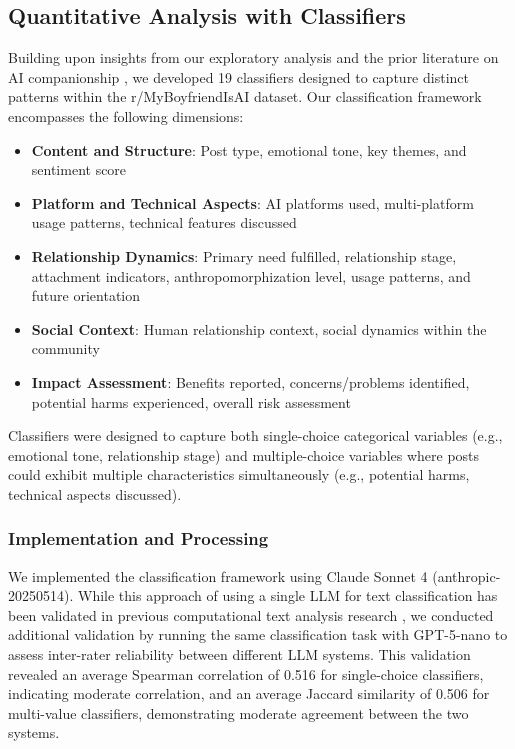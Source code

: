 \documentclass[sigconf, nonacm]{acmart}
\begin{document}
\subsection{Quantitative Analysis with Classifiers}
Building upon insights from our exploratory analysis and the prior literature on AI companionship \cite{zhang2025dark, phang2025investigating, fang2025ai, liu2024chatbot}, we developed 19 classifiers designed to capture distinct patterns within the r/MyBoyfriendIsAI dataset. Our classification framework encompasses the following dimensions:
\begin{itemize}
    \item \textbf{Content and Structure}: Post type, emotional tone, key themes, and sentiment score
    \item \textbf{Platform and Technical Aspects}: AI platforms used, multi-platform usage patterns, technical features discussed
    \item \textbf{Relationship Dynamics}: Primary need fulfilled, relationship stage, attachment indicators, anthropomorphization level, usage patterns, and future orientation
    \item \textbf{Social Context}: Human relationship context, social dynamics within the community
    \item \textbf{Impact Assessment}: Benefits reported, concerns/problems identified, potential harms experienced, overall risk assessment
\end{itemize}

Classifiers were designed to capture both single-choice categorical variables (e.g., emotional tone, relationship stage) and multiple-choice variables where posts could exhibit multiple characteristics simultaneously (e.g., potential harms, technical aspects discussed).

\subsubsection{Implementation and Processing}
We implemented the classification framework using Claude Sonnet 4 (anthropic-20250514). While this approach of using a single LLM for text classification has been validated in previous computational text analysis research \cite{tamkin2024clio, phang2025investigating, fang2025ai}, we conducted additional validation by running the same classification task with GPT-5-nano to assess inter-rater reliability between different LLM systems. This validation revealed an average Spearman correlation of 0.516 for single-choice classifiers, indicating moderate correlation, and an average Jaccard similarity of 0.506 for multi-value classifiers, demonstrating moderate agreement between the two systems. 
\end{document}
